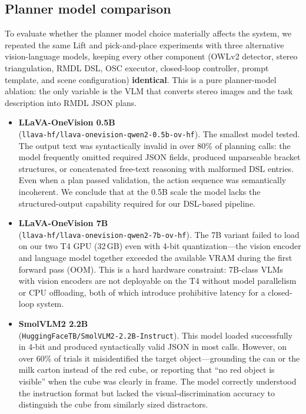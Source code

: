 \documentclass[conference]{IEEEtran}
\begin{document}
\subsection{Planner model comparison}
\label{sec:model-comp}

To evaluate whether the planner model choice materially affects the system, we repeated the same Lift and pick-and-place experiments with three alternative vision-language models, keeping every other component (OWLv2 detector, stereo triangulation, RMDL DSL, OSC executor, closed-loop controller, prompt template, and scene configuration) \textbf{identical}. This is a pure planner-model ablation: the only variable is the VLM that converts stereo images and the task description into RMDL JSON plans.

\begin{itemize}
\item \textbf{LLaVA-OneVision 0.5B} \\(\texttt{llava-hf/llava-onevision-qwen2-0.5b-ov-hf}). The smallest model tested. The output text was syntactically invalid in over 80\% of planning calls: the model frequently omitted required JSON fields, produced unparseable bracket structures, or concatenated free-text reasoning with malformed DSL entries. Even when a plan passed validation, the action sequence was semantically incoherent. We conclude that at the 0.5B scale the model lacks the structured-output capability required for our DSL-based pipeline.
\item \textbf{LLaVA-OneVision 7B} \\(\texttt{llava-hf/llava-onevision-qwen2-7b-ov-hf}). The 7B variant failed to load on our two T4 GPU (32\,GB) even with 4-bit quantization---the vision encoder and language model together exceeded the available VRAM during the first forward pass (OOM). This is a hard hardware constraint: 7B-class VLMs with vision encoders are not deployable on the T4 without model parallelism or CPU offloading, both of which introduce prohibitive latency for a closed-loop system.
\item \textbf{SmolVLM2 2.2B}\\ (\texttt{HuggingFaceTB/SmolVLM2-2.2B-Instruct}). This model loaded successfully in 4-bit and produced syntactically valid JSON in most calls. However, on over 60\% of trials it misidentified the target object---grounding the can or the milk carton instead of the red cube, or reporting that ``no red object is visible'' when the cube was clearly in frame. The model correctly understood the instruction format but lacked the visual-discrimination accuracy to distinguish the cube from similarly sized distractors.

\end{itemize}
\end{document}
